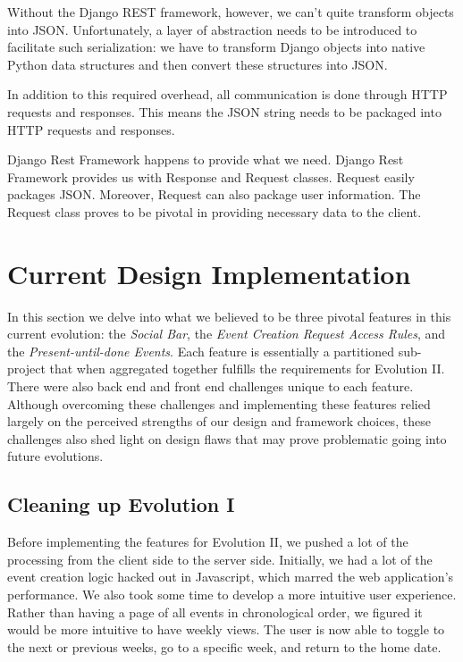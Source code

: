 \documentclass[a4paper]{article}
\begin{document}
Without the Django REST framework, however, we can't quite transform objects into JSON. Unfortunately, a layer of abstraction needs to be introduced to facilitate such serialization: we have to transform Django objects into native Python data structures  and then convert these structures into JSON. 

In addition to this required overhead, all communication is done through HTTP requests and responses. This means the JSON string needs to be packaged into HTTP requests and responses. 

Django Rest Framework happens to provide what we need. Django Rest Framework provides us with Response and Request classes. Request easily packages JSON. Moreover, Request can also package user information. The Request class proves to be pivotal in providing necessary data to the client.


\section{Current Design Implementation}

In this section we delve into what we believed to be three pivotal features in this current evolution: the \textit{Social Bar}, the \textit{Event Creation Request Access Rules}, and the \textit{Present-until-done Events}. Each feature is essentially a partitioned sub-project that when aggregated together fulfills the requirements for Evolution II. There were also back end and front end challenges unique to each feature. Although overcoming these challenges and implementing these features relied largely on the perceived strengths of our design and framework choices, these challenges also shed light on design flaws that may prove problematic going into future evolutions.

\subsection{Cleaning up Evolution I}

Before implementing the features for Evolution II, we pushed a lot of the processing from the client side to the server side. Initially, we had a lot of the event creation logic hacked out in Javascript, which marred the web application's performance. We also took some time to develop a more intuitive user experience. Rather than having a page of all events in chronological order, we figured it would be more intuitive to have weekly views. The user is now able to toggle to the next or previous weeks, go to a specific week, and return to the home date.
\end{document}
